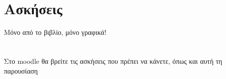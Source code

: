 \documentclass{presentation}
\begin{document}
\section{Ασκήσεις}
\begin{askisi}
  Μόνο από το βιβλίο, μόνο γραφικά!
\end{askisi}

\section{}
\begin{frame}
  Στο moodle θα βρείτε τις ασκήσεις που πρέπει να κάνετε, όπως και αυτή τη παρουσίαση
\end{frame}
\end{document}
